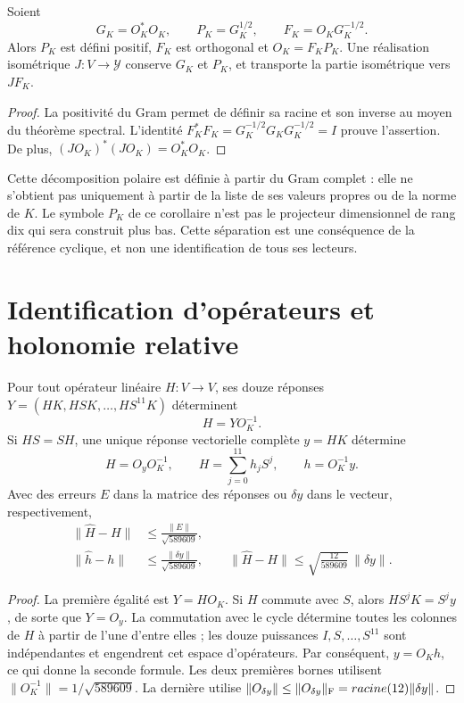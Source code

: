 \begin{corollary}
\label{x_reciprocidad:lib01:polar}
Soient
\[
 G_K=O_K^*O_K,\qquad P_K=G_K^{1/2},\qquad
 F_K=O_KG_K^{-1/2}.
\]
Alors \(P_K\) est défini positif, \(F_K\) est orthogonal et
\(O_K=F_KP_K\). Une réalisation isométrique \(J:V\to\mathcal Y\)
conserve \(G_K\) et \(P_K\), et transporte la partie isométrique vers
\(JF_K\).
\end{corollary}
\begin{proof}
La positivité du Gram permet de définir sa racine et son inverse au moyen du
théorème spectral. L’identité
\(F_K^*F_K=G_K^{-1/2}G_KG_K^{-1/2}=I\) prouve l’assertion.
De plus, \((JO_K)^*(JO_K)=O_K^*O_K\).
\end{proof}

Cette décomposition polaire est définie à partir du Gram complet : elle ne s’obtient pas uniquement à partir de la
liste de ses valeurs propres ou de la norme de \(K\). Le symbole
\(P_K\) de ce corollaire n’est pas le projecteur dimensionnel de rang dix
qui sera construit plus bas. Cette séparation est une conséquence de la
référence cyclique, et non une identification de tous ses lecteurs.

\section{Identification d'opérateurs et holonomie relative}
\label{x_reciprocidad:lib01:identificacion}

\begin{theorem}
\label{x_reciprocidad:lib01:operadores}
Pour tout opérateur linéaire \(H:V\to V\), ses douze réponses \(Y=(HK,HSK,\ldots,HS^{11}K)\) déterminent
\[
 H=YO_K^{-1}.
\]
Si \(HS=SH\), une unique réponse vectorielle complète \(y=HK\) détermine
\begin{equation}
 H=O_yO_K^{-1},\qquad
 H=\sum_{j=0}^{11}h_jS^j,\qquad h=O_K^{-1}y.
 \label{x_reciprocidad:lib01:filtro}
\end{equation}
Avec des erreurs \(E\) dans la matrice des réponses ou \(\delta y\) dans le
vecteur, respectivement,
\begin{align}
 \|\widehat H-H\|&\leq\frac{\|E\|}{\sqrt{589609}},
 \label{x_reciprocidad:lib01:error-matriz}\\
 \|\widehat h-h\|&\leq\frac{\|\delta y\|}{\sqrt{589609}},\qquad
 \|\widehat H-H\|\leq\sqrt{\frac{12}{589609}}\,\|\delta y\|.
 \label{x_reciprocidad:lib01:error-filtro}
\end{align}
\end{theorem}
\begin{proof}
La première égalité est \(Y=HO_K\). Si \(H\) commute avec \(S\), alors \(HS^jK=S^jy\), de sorte que \(Y=O_y\). La commutation avec le cycle détermine toutes les colonnes de \(H\) à partir de l'une d'entre elles ; les douze puissances \(I,S,\ldots,S^{11}\) sont indépendantes et engendrent cet espace d'opérateurs. Par conséquent, \(y=O_Kh\), ce qui donne la seconde formule. Les deux premières bornes utilisent \(\|O_K^{-1}\|=1/\sqrt{589609}\). La dernière utilise \(\|O_{\delta y}\|\leq\|O_{\delta y}\|_{\rm F}
=\sqrt{12}\|\delta y\|\).
\end{proof}

